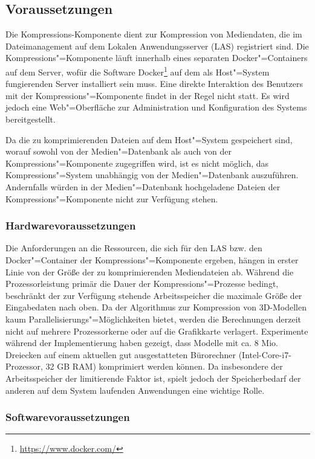 \subsection{Voraussetzungen}

Die Kompressions-Komponente dient zur Kompression von Mediendaten, die im Dateimanagement auf dem Lokalen Anwendungsserver (LAS) registriert sind. Die Kompressions"=Komponente läuft innerhalb eines separaten Docker"=Containers auf dem Server, wofür die Software Docker\footnote{\url{https://www.docker.com/}} auf dem als Host"=System fungierenden Server installiert sein muss. Eine direkte Interaktion des Benutzers mit der Kompressions"=Komponente findet in der Regel nicht statt. Es wird jedoch eine Web"=Oberfläche zur Administration und Konfiguration des Systems bereitgestellt. 

Da die zu komprimierenden Dateien auf dem Host"=System gespeichert sind, worauf sowohl von der Medien"=Datenbank als auch von der Kompressions"=Komponente zugegriffen wird, ist es nicht möglich, das Kompressions"=System unabhängig von der Medien"=Datenbank auszuführen. Andernfalls würden in der Medien"=Datenbank hochgeladene Dateien der Kompressions"=Komponente nicht zur Verfügung stehen. 

\subsubsection{Hardwarevoraussetzungen}
\label{schlenke:chp:info:hardware}

Die Anforderungen an die Ressourcen, die sich für den LAS bzw. den Docker"=Container der Kompressions"=Komponente ergeben, hängen in erster Linie von der Größe der zu komprimierenden Mediendateien ab. Während die Prozessorleistung primär die Dauer der Kompressions"=Prozesse bedingt, beschränkt der zur Verfügung stehende Arbeitsspeicher die maximale Größe der Eingabedaten nach oben.
Da der Algorithmus zur Kompression von 3D-Modellen kaum Parallelisierungs"=Möglichkeiten bietet, werden die Berechnungen derzeit nicht auf mehrere Prozessorkerne oder auf die Grafikkarte verlagert. 
Experimente während der Implementierung haben gezeigt, dass Modelle mit ca. 8 Mio. Dreiecken auf einem aktuellen gut ausgestatteten Bürorechner (Intel-Core-i7-Prozessor, 32 GB RAM) komprimiert werden können. Da insbesondere der Arbeitsspeicher der limitierende Faktor ist, spielt jedoch der Speicherbedarf der anderen auf dem System laufenden Anwendungen eine wichtige Rolle.

\subsubsection{Softwarevoraussetzungen}

